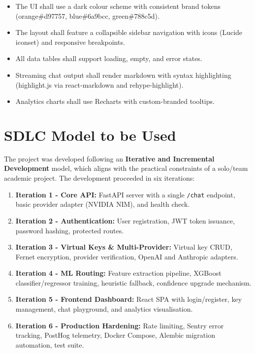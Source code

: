 \documentclass[12pt,a4paper]{report}
\begin{document}
\begin{itemize}[nosep]
    \item The UI shall use a dark colour scheme with consistent brand tokens (orange\#d97757, blue\#6a9bcc, green\#788c5d).
    \item The layout shall feature a collapsible sidebar navigation with icons (Lucide iconset) and responsive breakpoints.
    \item All data tables shall support loading, empty, and error states.
    \item Streaming chat output shall render markdown with syntax highlighting (highlight.js via react-markdown and rehype-highlight).
    \item Analytics charts shall use Recharts with custom-branded tooltips.
\end{itemize}

\section{SDLC Model to be Used}

The project was developed following an \textbf{Iterative and Incremental Development} model, which aligns with the practical constraints of a solo/team academic project. The development proceeded in six iterations:

\begin{enumerate}[nosep]
    \item \textbf{Iteration 1 - Core API:} FastAPI server with a single \texttt{/chat} endpoint, basic provider adapter (NVIDIA NIM), and health check.
    \item \textbf{Iteration 2 - Authentication:} User registration, JWT token issuance, password hashing, protected routes.
    \item \textbf{Iteration 3 - Virtual Keys \& Multi-Provider:} Virtual key CRUD, Fernet encryption, provider verification, OpenAI and Anthropic adapters.
    \item \textbf{Iteration 4 - ML Routing:} Feature extraction pipeline, XGBoost classifier/regressor training, heuristic fallback, confidence upgrade mechanism.
    \item \textbf{Iteration 5 - Frontend Dashboard:} React SPA with login/register, key management, chat playground, and analytics visualisation.
    \item \textbf{Iteration 6 - Production Hardening:} Rate limiting, Sentry error tracking, PostHog telemetry, Docker Compose, Alembic migration automation, test suite.
\end{enumerate}
\end{document}
